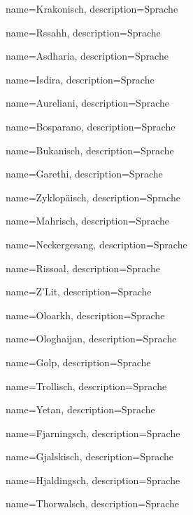 {
    name={Krakonisch},
    description={Sprache}
}


{
    name={Rssahh},
    description={Sprache}
}


{
    name={Asdharia},
    description={Sprache}
}


{
    name={Isdira},
    description={Sprache}
}


{
    name={Aureliani},
    description={Sprache}
}


{
    name={Bosparano},
    description={Sprache}
}


{
    name={Bukanisch},
    description={Sprache}
}


{
    name={Garethi},
    description={Sprache}
}


{
    name={Zyklopäisch},
    description={Sprache}
}


{
    name={Mahrisch},
    description={Sprache}
}


{
    name={Neckergesang},
    description={Sprache}
}


{
    name={Rissoal},
    description={Sprache}
}


{
    name={Z’Lit},
    description={Sprache}
}


{
    name={Oloarkh},
    description={Sprache}
}


{
    name={Ologhaijan},
    description={Sprache}
}


{
    name={Golp},
    description={Sprache}
}


{
    name={Trollisch},
    description={Sprache}
}


{
    name={Yetan},
    description={Sprache}
}


{
    name={Fjarningsch},
    description={Sprache}
}


{
    name={Gjalskisch},
    description={Sprache}
}


{
    name={Hjaldingsch},
    description={Sprache}
}


{
    name={Thorwalsch},
    description={Sprache}
}


